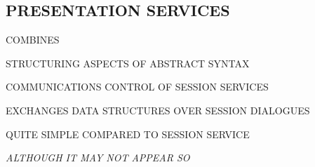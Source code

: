 

\begin{bwslide}
\part	{PRESENTATION SERVICES}\bf

\end{bwslide}


\begin{bwslide}

\begin{nrtc}
\item	COMBINES
	\begin{nrtc}
	\item	STRUCTURING ASPECTS OF ABSTRACT SYNTAX
	\item	COMMUNICATIONS CONTROL OF SESSION SERVICES
	\end{nrtc}
\item	EXCHANGES DATA STRUCTURES OVER SESSION DIALOGUES
\end{nrtc}
\end{bwslide}




\begin{bwslide}

\begin{nrtc}
\item	QUITE SIMPLE COMPARED TO SESSION SERVICE
	\begin{nrtc}
	\item	{\em ALTHOUGH IT MAY NOT APPEAR SO}
	\end{nrtc}
\end{nrtc}
\end{bwslide}


%


